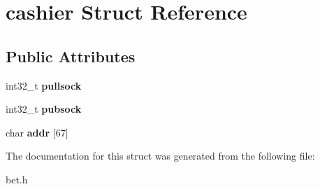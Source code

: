 \hypertarget{structcashier}{}\section{cashier Struct Reference}
\label{structcashier}
\subsection*{Public Attributes}
\begin{DoxyCompactItemize}
\item 
\mbox{\label{structcashier_a0b5bb840a70a75c97b3a2ea956e38d74}} 
int32\+\_\+t {\bfseries pullsock}
\item 
\mbox{\label{structcashier_a446347ed86dea33ee1b83be7b78fe4c9}} 
int32\+\_\+t {\bfseries pubsock}
\item 
\mbox{\label{structcashier_ac1cabcc8e9aad13e98becac8c3effccb}} 
char {\bfseries addr} \mbox{[}67\mbox{]}
\end{DoxyCompactItemize}


The documentation for this struct was generated from the following file\+:\begin{DoxyCompactItemize}
\item 
bet.\+h\end{DoxyCompactItemize}
